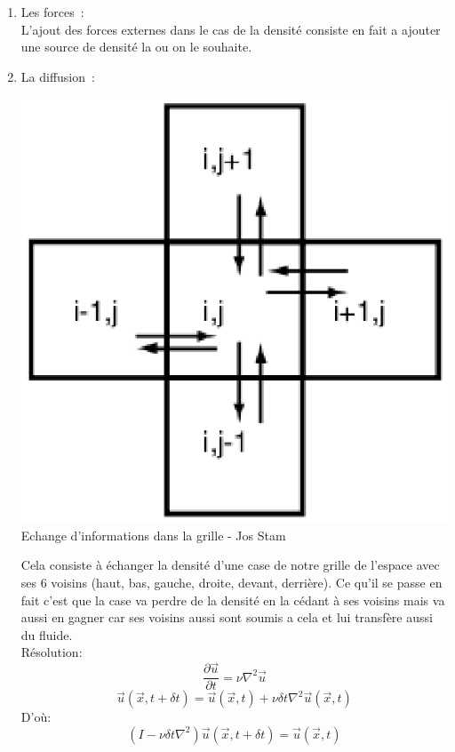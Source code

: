 \documentclass[a4paper,10pt]{article}
\begin{document}
\begin{enumerate}
\item{Les forces~:}\\ L'ajout des forces externes dans le cas de la
  densité consiste en fait a ajouter une source de densité la ou on le
  souhaite.\\
\item{La diffusion~:}\\ 

    \begin{center}
	\includegraphics[scale=0.5]{STAM.ps}\\
	Echange d'informations dans la grille - Jos Stam
    \end{center}
  
  Cela consiste à échanger la densité d'une case
  de notre grille de l'espace avec ses 6 voisins (haut, bas, gauche,
  droite, devant, derrière). Ce qu'il se passe en fait c'est que la
  case va perdre de la densité en la cédant à ses voisins mais va
  aussi en gagner car ses voisins aussi sont soumis a cela et lui
  transfère aussi du fluide.\\ 
  
  
  Résolution:
  \begin{equation}
    \frac{\partial \vec{u}}{\partial t} =  \nu{\nabla^2}\vec{u} 
  \end{equation}
  \begin{equation}
    \vec{u}(\vec{x},t+\delta t) = \vec{u}(\vec{x},t) +\nu \delta t {\nabla^2} \vec{u}(\vec{x},t) 
  \end{equation}
  D'où:
  \begin{equation}
    (I - \nu \delta t {\nabla^2})\vec{u}(\vec{x},t+\delta t) = \vec{u}(\vec{x},t) 
  \end{equation}
  \\
  

\end{enumerate}
\end{document}
